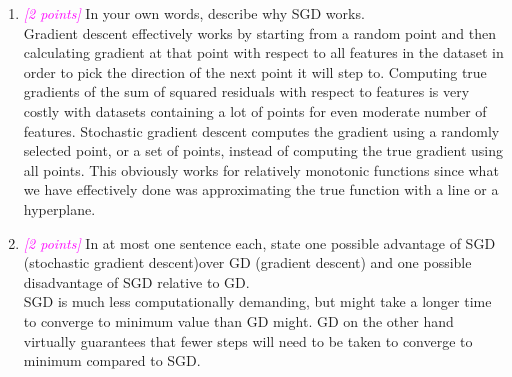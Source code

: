 \documentclass{article}
\newcommand{\1}{\mathbf{1}}
\newcommand{\points}[1]{\small\textcolor{magenta}{\emph{[#1 points]}} \normalsize}
\begin{document}
\begin{enumerate}
    \item \points{2} In your own words, describe why SGD works. \\
    Gradient descent effectively works by starting from a random point and then calculating gradient at that point with respect to all features in the dataset in order to pick the direction of the next point it will step to. Computing true gradients of the sum of squared residuals with respect to features is very costly with datasets containing a lot of points for even moderate number of features. Stochastic gradient descent computes the gradient using a randomly selected point, or a set of points, instead of computing the true gradient using all points. This obviously works for relatively monotonic functions since what we have effectively done was approximating the true function with a line or a hyperplane.
    
    \item \points{2}In at most one sentence each, state one possible advantage of SGD (stochastic gradient descent)over GD (gradient descent) and one possible disadvantage of SGD relative to GD. \\
    SGD is much less computationally demanding, but might take a longer time to converge to minimum value than GD might. GD on the other hand virtually guarantees that fewer steps will need to be taken to converge to minimum compared to SGD.
    \end{enumerate}




\newpage
\end{document}

